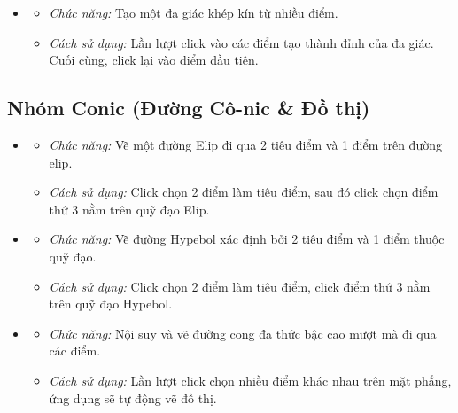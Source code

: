 \documentclass[12pt,a4paper]{article}
\begin{document}
\begin{itemize}[label=\textcolor{primary}{\faDrawPolygon}]
    \item {}
    \begin{itemize}
        \item \textit{Chức năng:} Tạo một đa giác khép kín từ nhiều điểm.
        \item \textit{Cách sử dụng:} Lần lượt click vào các điểm tạo thành đỉnh của đa giác. Cuối cùng, click lại vào điểm đầu tiên.
    \end{itemize}
\end{itemize}

\subsection{Nhóm Conic (Đường Cô-nic \& Đồ thị)}
\begin{itemize}[label=\textcolor{primary}{\faWaveSquare}]
    \item {}
    \begin{itemize}
        \item \textit{Chức năng:} Vẽ một đường Elip đi qua 2 tiêu điểm và 1 điểm trên đường elip.
        \item \textit{Cách sử dụng:} Click chọn 2 điểm làm tiêu điểm, sau đó click chọn điểm thứ 3 nằm trên quỹ đạo Elip.
    \end{itemize}
    
    \item {}
    \begin{itemize}
        \item \textit{Chức năng:} Vẽ đường Hypebol xác định bởi 2 tiêu điểm và 1 điểm thuộc quỹ đạo.
        \item \textit{Cách sử dụng:} Click chọn 2 điểm làm tiêu điểm, click điểm thứ 3 nằm trên quỹ đạo Hypebol.
    \end{itemize}

    \item {}
    \begin{itemize}
        \item \textit{Chức năng:} Nội suy và vẽ đường cong đa thức bậc cao mượt mà đi qua các điểm.
        \item \textit{Cách sử dụng:} Lần lượt click chọn nhiều điểm khác nhau trên mặt phẳng, ứng dụng sẽ tự động vẽ đồ thị.
    \end{itemize}
\end{itemize}
\end{document}
